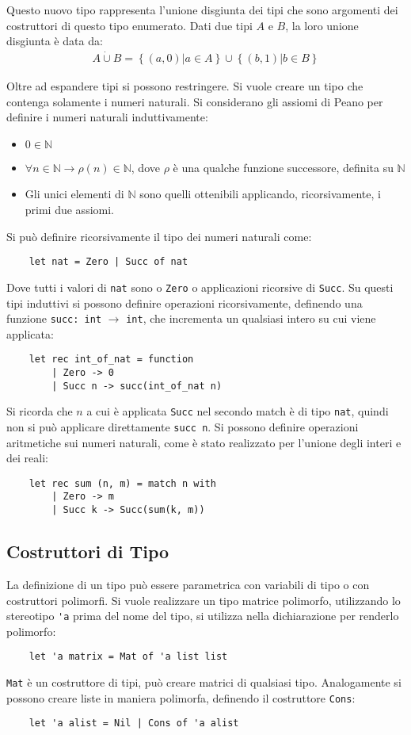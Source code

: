 \documentclass{article}
\numberwithin{equation}{subsection}
\begin{document}
Questo nuovo tipo rappresenta l'unione disgiunta dei tipi che sono argomenti dei costruttori di questo tipo enumerato. Dati due tipi $A$ e $B$, la loro unione disgiunta è data da:
\begin{gather*}
    A\dot\cup B=\left\{(a,0)\big|a\in A\right\}\cup\left\{(b,1)\big|b\in B\right\}
\end{gather*}


Oltre ad espandere tipi si possono restringere. Si vuole creare un tipo che contenga solamente i numeri naturali. Si considerano gli assiomi di Peano per definire i numeri naturali induttivamente:
\begin{itemize}
    \item $0\in\mathbb{N}$
    \item $\forall n\in\mathbb{N}\to\rho(n)\in\mathbb{N}$, dove $\rho$ è una qualche funzione successore, definita su $\mathbb{N}$
    \item Gli unici elementi di $\mathbb{N}$ sono quelli ottenibili applicando, ricorsivamente, i primi due assiomi. 
\end{itemize}
Si può definire ricorsivamente il tipo dei numeri naturali come:
\begin{verbatim}
    let nat = Zero | Succ of nat    
\end{verbatim}
Dove tutti i valori di \verb|nat| sono o \verb|Zero| o applicazioni ricorsive di \verb|Succ|. Su questi tipi induttivi si possono definire operazioni ricorsivamente, definendo una funzione \verb|succ: int| $\rightarrow$ \verb|int|, che incrementa un qualsiasi intero su cui viene applicata:
\begin{verbatim}
    let rec int_of_nat = function
        | Zero -> 0
        | Succ n -> succ(int_of_nat n)
\end{verbatim}
Si ricorda che $n$ a cui è applicata \verb|Succ| nel secondo match è di tipo \verb|nat|, quindi non si può applicare direttamente \verb|succ n|. 
Si possono definire operazioni aritmetiche sui numeri naturali, come è stato realizzato per l'unione degli interi e dei reali:
\begin{verbatim}
    let rec sum (n, m) = match n with
        | Zero -> m
        | Succ k -> Succ(sum(k, m))
\end{verbatim}

\subsection{Costruttori di Tipo}

La definizione di un tipo può essere parametrica con variabili di tipo o con costruttori polimorfi. Si vuole realizzare un tipo matrice polimorfo, utilizzando lo stereotipo \verb|'a| prima del nome del tipo, si utilizza nella dichiarazione per renderlo polimorfo:
\begin{verbatim}
    let 'a matrix = Mat of 'a list list    
\end{verbatim}
\verb|Mat| è un costruttore di tipi, può creare matrici di qualsiasi tipo. Analogamente si possono creare liste in maniera polimorfa, definendo il costruttore \verb|Cons|:
\begin{verbatim}
    let 'a alist = Nil | Cons of 'a alist    
\end{verbatim}
\end{document}
